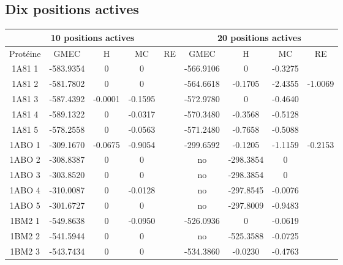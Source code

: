 \documentclass[a4paper,12pt]{article}
\begin{document}
\listoffigures


   \subsection{ Dix positions actives}


    \begin{table}[h]
      \centering

      \begin{tabular}{|c|c|c|c|c|c|c|c|c|}


        \hline
        \multicolumn{5}{|c|}{10 positions actives}  & \multicolumn{4}{|c|}{20 positions actives} \\
        \hline
        Protéine & GMEC & H & MC & RE & GMEC & H & MC & RE \\
        \hline
        1A81 1 & -583.9354 & 0 & 0 & &                        -566.9106 & 0 & -0.3275 & \\            
        1A81 2 & -581.7802 & 0 & 0 & &                        -564.6618 & -0.1705 & -2.4355 & -1.0069 \\
        1A81 3 & -587.4392 & -0.0001 & -0.1595 & &            -572.9780 & 0 & -0.4640 & \\            
        1A81 4 & -589.1322 & 0 & -0.0317 & &                  -570.3480 & -0.3568 & -0.5128 & \\      
        1A81 5 & -578.2558 & 0 & -0.0563 & &                  -571.2480 & -0.7658 & -0.5088 & \\      
        1ABO 1 & -309.1670 & -0.0675 & -0.9054 & &            -299.6592 & -0.1205 & -1.1159 & -0.2153 \\
        1ABO 2 & -308.8387 & 0 & 0 & &                        no & -298.3854 & 0 & \\                 
        1ABO 3 & -303.8520 & 0 & 0 & &                        no & -298.3854 & 0 & \\                 
        1ABO 4 & -310.0087 & 0 & -0.0128 & &                  no & -297.8545 & -0.0076 & \\           
        1ABO 5 & -301.6727 & 0 & 0 & &                        no & -297.8009 & -0.9483 & \\           
        1BM2 1 & -549.8638 & 0 & -0.0950 & &                  -526.0936 & 0 & -0.0619 & \\            
        1BM2 2 & -541.5944 & 0 & 0 & &                        no & -525.3588 & -0.0725 & \\           
        1BM2 3 & -543.7434 & 0 & 0 & &                        -534.3860 & -0.0230 & -0.4763 & \\      

\end{tabular}
\end{table}
\end{document}
